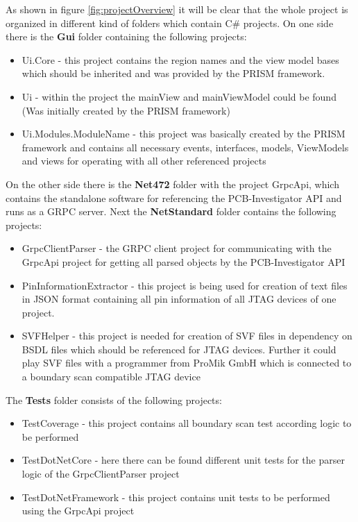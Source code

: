 As shown in figure \ref{fig:projectOverview} it will be clear that the whole project is organized in different kind of folders which contain C\# projects. On one side there is the \textbf{Gui} folder containing the following projects:
\begin{itemize}
	\item Ui.Core - this project contains the region names and the view model bases which should be inherited and was provided by the PRISM framework.
	\item Ui - within the project the mainView and mainViewModel could be found (Was initially created by the PRISM framework)
	\item Ui.Modules.ModuleName - this project was basically created by the PRISM framework and contains all necessary events, interfaces, models, ViewModels and views for operating with all other referenced projects
\end{itemize}
On the other side there is the \textbf{Net472} folder with the project GrpcApi, which contains the standalone software for referencing the \ac{PCB}-Investigator \ac{API} and runs as a \ac{GRPC} server. Next the \textbf{NetStandard} folder contains the following projects:
\begin{itemize}
	\item GrpcClientParser - the \ac{GRPC} client project for communicating with the GrpcApi project for getting all parsed objects by the \ac{PCB}-Investigator \ac{API}
	\item PinInformationExtractor - this project is being used for creation of text files in \ac{JSON} format containing all pin information of all \ac{JTAG} devices of one project.
	\item SVFHelper - this project is needed for creation of \ac{SVF} files in dependency on \ac{BSDL} files which should be referenced for \ac{JTAG} devices. Further it could play \ac{SVF} files with a programmer from ProMik GmbH which is connected to a boundary scan compatible \ac{JTAG} device
\end{itemize}
The \textbf{Tests} folder consists of the following projects:
\begin{itemize}
	\item TestCoverage - this project contains all boundary scan test according logic to be performed
	\item TestDotNetCore - here there can be found different unit tests for the parser logic of the GrpcClientParser project
	\item TestDotNetFramework - this project contains unit tests to be performed using the GrpcApi project
\end{itemize}
